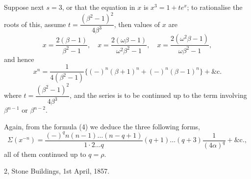 \documentclass[12pt,a4paper]{article}
\theoremstyle{plain}
\theoremstyle{definition}
\begin{document}
Suppose next $s = 3$, or that the equation in $x$ is $x^3 = 1 + te^x$; to rationalise the roots of this, assume $t = \dfrac{(\beta^2 - 1)^2}{4\beta^3}$, then values of $x$ are
\[
x = \frac{2(\beta - 1)}{\beta^2 - 1}, \quad x = \frac{2(\omega\beta - 1)}{\omega^2\beta^2 - 1}, \quad x = \frac{2(\omega^2\beta - 1)}{\omega\beta^2 - 1},
\]
and hence
\[
x^n = \frac{1}{4(\beta^2 - 1)}\{(-)^n(\beta + 1)^n + (-)^n(\beta - 1)^n\} + \&\text{c.} \tag{15}
\]
where $t = \dfrac{(\beta^2 - 1)^2}{4\beta^3}$, and the series is to be continued up to the term involving $\beta^{n-1}$ or $\beta^{n-2}$.

Again, from the formula (4) we deduce the three following forms,
\[
\Sigma(x^{-n}) = \frac{(-)^q n(n - 1)\ldots(n - q + 1)}{1 \cdot 2 \ldots q}(q + 1)\ldots(q + 3)\frac{1}{(4\alpha)^q} + \&\text{c.}, \tag{16}
\]
all of them continued up to $q = \rho$.

\begin{flushright}
2, Stone Buildings, 1st April, 1857.
\end{flushright}
\end{document}
